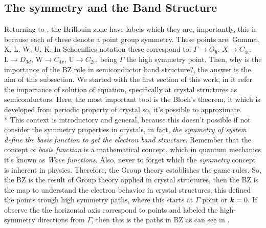 \subsection{The symmetry and the Band Structure}
\label{subsec:chapter-2-brillouin-bandstructure}
\vspace{-10mm}
Returning to , the Brillouin zone have labels which they are, importantly, this is because  each of these denote a point group symmetry. These points are:  Gamma, X, L, W, U, K.  In Schoenflies notation these correspond to: $\Gamma\to O_{h}$, $X\to C_{4v}$, $\mathrm{L}\to D_{3d}$, $\mathrm{W}\to C_{4v}$, $\mathrm{U}\to C_{2v}$, being $\Gamma$ the high symmetry point. Then, why is the importance of the \gls{BZ} role in semiconductor band structure?, the answer is the aim of this subsection. We started with the first section of this work, in it refer the importance of solution of \sch  equation, specifically at crystal structures as semiconductors. Here, the most important tool is the Bloch's theorem, it which is developed from periodic property of crystal  so, it's possible to approximate.\\*
This context is introductory and general, because this doesn't possible if  not consider the symmetry properties in crystals, in fact, \emph{the symmetry of system define the basis function to get the electron band structure}\cite{dresselhaus2007group,cardona2005fundamentals,parmenter1955symmetry,butcher2013crystalline}.  Remember that the concept of \emph{basis function} is a mathematical concept, which in quantum mechanics it's known as \emph{Wave functions}. Also, never to forget which the \emph{symmetry} concept is inherent in physics. Therefore, the Group theory establishes the game rules. 
So, the \gls{BZ} is the result of Group theory applied in crystal structures, then the \gls{BZ} is the map to understand the electron behavior in crystal structures, this defined the \ks points trough high symmetry paths, where this starts at $\Gamma$ point or $\boldsymbol{k} =0$.  If observe the  the horizontal axis correspond to \ks points and labeled the high-symmetry directions from $\Gamma$, then this is the \ks paths in \gls{BZ} as can see in . 


